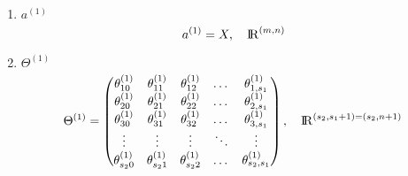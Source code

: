 \begin{enumerate}
\item $a^{(1)}$
\begin{equation}
	a^{(1)} = X , \quad {\rm I\!R}^{(m,n)}
\end{equation}

\item $\Theta^{(1)}$
\begin{equation}
\Theta^{(1)} = 
	\left(\begin{matrix}
		\theta_{10}^{(1)} & \theta_{11}^{(1)} & \theta_{12}^{(1)} & \dots & \theta_{1,s_1}^{(1)} \\
		\theta_{20}^{(1)} & \theta_{21}^{(1)} & \theta_{22}^{(1)} & \dots & \theta_{2,s_1}^{(1)} \\
		\theta_{30}^{(1)} & \theta_{31}^{(1)} & \theta_{32}^{(1)} & \dots & \theta_{3,s_1}^{(1)} \\
		\vdots    & \vdots    & \vdots    & \ddots & \vdots   \\
		\theta_{s_{2}0}^{(1)} & \theta_{s_{2}1}^{(1)} & \theta_{s_{2}2}^{(1)} & \dots & \theta_{s_{2},s_{1}}^{(1)}
	\end{matrix}\right), \quad {\rm I\!R}^{(s_{2},s_1+1)=(s_{2},n+1)}
\end{equation}


\end{enumerate}
